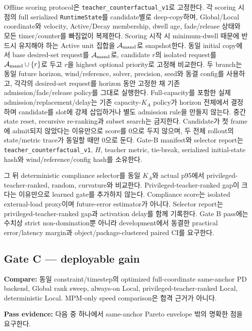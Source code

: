 \documentclass[10pt]{article}
\newcommand{\code}[1]{{\small\nolinkurl{#1}}}
\newcommand{\must}[1]{\textcolor{CoreBlue}{\textbf{#1}}}
\begin{document}
Offline scoring protocol은 \code{teacher\_counterfactual\_v1}로 고정한다.
각 scoring 시점의 full serialized \code{RuntimeState}를 candidate별로 deep-copy하며,
Global/Local coordinate와 velocity, Active/Decay membership, dwell age, fade/release 상태와
모든 timer/counter를 빠짐없이 복제한다. Scoring 시작 시 minimum-dwell 때문에 반드시 유지해야 하는
Active unit 집합을 \(\mathcal A_{\rm mand}\)로 snapshot한다. 동일 initial copy에서
base desired-set request를 \(\mathcal A_{\rm mand}\)로, candidate \(r\)의 isolated request를
\(\mathcal A_{\rm mand}\cup\{r\}\)로 두고 \(r\)을 highest optional priority로 고정해 비교한다.
두 branch는 동일 future horizon, wind/reference, solver, precision, seed와 동결 config를 사용하고,
각각의 desired-set request를 horizon 동안 고정한 채 기존 admission/fade/release policy를 그대로 실행한다.
Full-capacity를 포함한 실제 admission/replacement/delay는 기존 capacity-\(K_A\) policy가 horizon 전체에서
결정하며 candidate를 slot에 강제 삽입하거나 별도 admission rule을 만들지 않는다.
중간 state reset, recursive re-ranking과 subset search는 금지한다.
Candidate가 첫 frame에 admit되지 않았다는 이유만으로 score를 0으로 두지 않으며,
두 전체 rollout의 state/metric trace가 동일할 때만 0으로 둔다.
Gate-B manifest와 selector report는 \code{teacher\_counterfactual\_v1}, \(H\), teacher metric,
tie-break, serialized initial-state hash와 wind/reference/config hash를 소유한다.

그 뒤 deterministic compliance selector를 동일 \(K_A\)와 actual p95에서 privileged-teacher-ranked,
random, curvature와 비교한다. Privileged-teacher-ranked gap이 크다는 이유만으로 learned gate를 추가하지 않는다.
Compliance score는 isolated external-load proxy이며 future-error estimator가 아니다.
Selector report는 privileged-teacher-ranked gap과 activation delay를 함께 기록한다.
Gate B pass에는 수치상 strict non-domination뿐 아니라 development에서 동결한 practical
error/latency margin과 object/package-clustered paired CI를 요구한다.

\subsection{Gate C --- deployable gain}

\must{Compare:} 동일 constraint/timestep의 optimized full-coordinate same-anchor PD backend,
Global rank sweep, always-on Local,
privileged-teacher-ranked Local, deterministic Local. MPM-only speed comparison은 합격 근거가 아니다.

\must{Pass evidence:} 다음 중 하나에서 same-anchor Pareto envelope 밖의 명확한 점을 요구한다.
\end{document}
